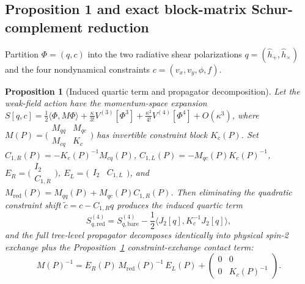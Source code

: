 \documentclass[11pt]{article}
\newtheorem{proposition}{Proposition}
\begin{document}
\subsection{Proposition 1 and exact block-matrix Schur-complement reduction}

Partition $\Phi = (q, c)$ into the two radiative shear polarizations $q = (\hat h_+, \hat h_\times)$ and the four nondynamical constraints $c = (v_x, v_y, \phi, f)$.

\begin{proposition}[Induced quartic term and propagator decomposition]\label{prop:constraint}
Let the weak-field action have the momentum-space expansion $S[q,c] = \frac{1}{2}\langle\Phi, M\Phi\rangle + \frac{\kappa}{3!}V^{(3)}[\Phi^3] + \frac{\kappa^2}{4!}V^{(4)}[\Phi^4] + O(\kappa^3)$, where $M(P) = \bigl(\begin{smallmatrix}M_{qq} & M_{qc}\\ M_{cq} & K_c\end{smallmatrix}\bigr)$ has invertible constraint block $K_c(P)$. Set $C_{1,R}(P) = -K_c(P)^{-1}M_{cq}(P)$, $C_{1,L}(P) = -M_{qc}(P)K_c(P)^{-1}$, $E_R = \bigl(\begin{smallmatrix}I_2\\ C_{1,R}\end{smallmatrix}\bigr)$, $E_L = \bigl(\begin{smallmatrix}I_2 & C_{1,L}\end{smallmatrix}\bigr)$, and $M_{\mathrm{red}}(P) = M_{qq}(P) + M_{qc}(P)C_{1,R}(P)$. Then eliminating the quadratic constraint shift $\tilde c = c - C_{1,R} q$ produces the induced quartic term
\begin{equation}\label{eq:prop1}
S_{q,\mathrm{red}}^{(4)} = S_{q,\mathrm{bare}}^{(4)} - \frac{1}{2}\langle J_2[q], K_c^{-1} J_2[q]\rangle,
\end{equation}
and the full tree-level propagator decomposes identically into physical spin-2 exchange plus the Proposition~\ref{prop:constraint} constraint-exchange contact term:
\begin{equation}\label{eq:schur_prop}
M(P)^{-1} = E_R(P)\,M_{\mathrm{red}}(P)^{-1}\,E_L(P) + \begin{pmatrix}0 & 0\\ 0 & K_c(P)^{-1}\end{pmatrix}.
\end{equation}
\end{proposition}
\end{document}
